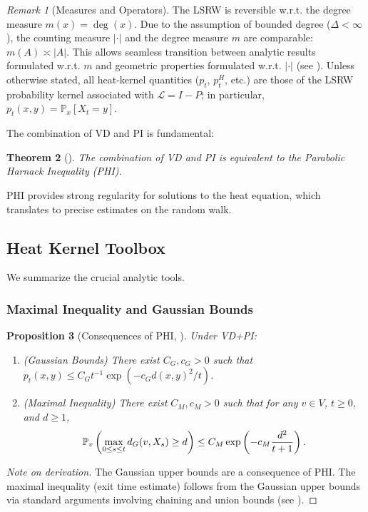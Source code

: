\documentclass{article}
\numberwithin{equation}{section}
\newtheorem{theorem}{Theorem}[section]
\newtheorem{proposition}[theorem]{Proposition}
\theoremstyle{definition}
\theoremstyle{remark}
\newtheorem{remark}[theorem]{Remark}
\newcommand{\LL}{\mathcal{L}}
\newcommand{\Prob}{\mathbb{P}}
\begin{document}
\begin{remark}[Measures and Operators]\label{rem:measures_operators}
The LSRW is reversible w.r.t. the degree measure $m(x)=\deg(x)$. Due to the assumption of bounded degree ($\Delta < \infty$), the counting measure $|\cdot|$ and the degree measure $m$ are comparable: $m(A) \asymp |A|$. This allows seamless transition between analytic results formulated w.r.t. $m$ and geometric properties formulated w.r.t. $|\cdot|$ (see \cite{Coulhon03}).
Unless otherwise stated, all heat-kernel quantities ($p_t$, $p_t^H$, etc.) are those of the LSRW probability kernel associated with $\LL=I-P$; in particular, $p_t(x,y)=\Prob_x[X_t=y]$.
\end{remark}

The combination of VD and PI is fundamental:

\begin{theorem}[\cite{Delmotte99}]\label{thm:Delmotte}
The combination of VD and PI is equivalent to the Parabolic Harnack Inequality (PHI).
\end{theorem}

PHI provides strong regularity for solutions to the heat equation, which translates to precise estimates on the random walk.

\subsection{Heat Kernel Toolbox}
We summarize the crucial analytic tools.

\subsubsection{Maximal Inequality and Gaussian Bounds}

\begin{proposition}[Consequences of PHI, \cite{Delmotte99}]\label{prop:maximal}
Under VD+PI:
\begin{enumerate}
    \item (Gaussian Bounds) There exist $C_G, c_G > 0$ such that $p_t(x,y) \leq C_G t^{-1} \exp(-c_G d(x,y)^2/t)$.
    \item (Maximal Inequality) There exist $C_M,c_M > 0$ such that for any $v \in V$, $t \geq 0$, and $d \geq 1$,
    \begin{equation}\label{eq:max_ineq}
    \small
    \Prob_v\left( \max_{0 \leq s \leq t} d_G(v,X_s) \geq d \right) \leq C_M \exp\left(-c_M \frac{d^2}{t+1}\right).
    \end{equation}
\end{enumerate}
\end{proposition}
\begin{proof}[Note on derivation]
The Gaussian upper bounds are a consequence of PHI. The maximal inequality (exit time estimate) follows from the Gaussian upper bounds via standard arguments involving chaining and union bounds (see \cite{Grigoryan09}).
\end{proof}
\end{document}
